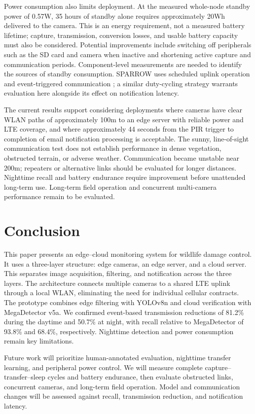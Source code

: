 \documentclass[conference]{IEEEtran}
\begin{document}
Power consumption also limits deployment. At the measured whole-node standby power of 0.57W, 35 hours of standby alone requires approximately 20Wh delivered to the camera. This is an energy requirement, not a measured battery lifetime; capture, transmission, conversion losses, and usable battery capacity must also be considered. Potential improvements include switching off peripherals such as the SD card and camera when inactive and shortening active capture and communication periods. Component-level measurements are needed to identify the sources of standby consumption. SPARROW uses scheduled uplink operation and event-triggered communication \cite{SPARROW2026}; a similar duty-cycling strategy warrants evaluation here alongside its effect on notification latency.

The current results support considering deployments where cameras have clear WLAN paths of approximately 100m to an edge server with reliable power and LTE coverage, and where approximately 44 seconds from the PIR trigger to completion of email notification processing is acceptable. The sunny, line-of-sight communication test does not establish performance in dense vegetation, obstructed terrain, or adverse weather. Communication became unstable near 200m; repeaters or alternative links should be evaluated for longer distances. Nighttime recall and battery endurance require improvement before unattended long-term use. Long-term field operation and concurrent multi-camera performance remain to be evaluated.

\section{Conclusion}
This paper presents an edge--cloud monitoring system for wildlife damage control. It uses a three-layer structure: edge cameras, an edge server, and a cloud server. This separates image acquisition, filtering, and notification across the three layers. The architecture connects multiple cameras to a shared LTE uplink through a local WLAN, eliminating the need for individual cellular contracts. The prototype combines edge filtering with YOLOv8n and cloud verification with MegaDetector v5a. We confirmed event-based transmission reductions of 81.2\% during the daytime and 50.7\% at night, with recall relative to MegaDetector of 93.8\% and 68.4\%, respectively. Nighttime detection and power consumption remain key limitations.

Future work will prioritize human-annotated evaluation, nighttime transfer learning, and peripheral power control. We will measure complete capture--transfer--sleep cycles and battery endurance, then evaluate obstructed links, concurrent cameras, and long-term field operation. Model and communication changes will be assessed against recall, transmission reduction, and notification latency.
\end{document}
